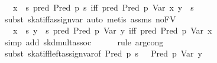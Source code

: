 \begin{isabellebody}
\ {}{}{}{}\ {}\ x\ {}{}\ s{}\ pred\ {}Pred\ p\ {}s{}{}\ iff\ pred\ {}Pred\ p\ {}Var\ x{}{}{}\ y\ {}{}\ s{}\isanewline
\ \ \ \ \isamarkupfalse%
\ {}subst\ skat{}iff{}assign{}var{}\ auto{}\ metis\ assms\ no{}FV{}\isanewline
\ \ \isamarkupfalse%
\ \isamarkupfalse%
\ {}{}{}{}\ {}\ x\ {}{}\ s{}\ y\ {}{}\ s{}\ pred\ {}Pred\ p\ {}Var\ y{}{}\ iff\ pred\ {}Pred\ p\ {}Var\ x{}{}{}\isanewline
\ \ \ \ \isamarkupfalse%
\ {}simp\ add{}\ skd{}mult{}assoc{}\isanewline
\ \ \ \ \isamarkupfalse%
\ {}rule\ arg{}cong{}\ \isamarkupfalse%
\isanewline
\ \ \ \ \isamarkupfalse%
\ {}subst\ skat{}iff{}left{}assign{}var{}of\ {}Pred\ p\ {}s{}{}\ {}\ {}\ {}Pred\ p\ {}Var\ y{}{}{}{}\isanewline

\end{isabellebody}
